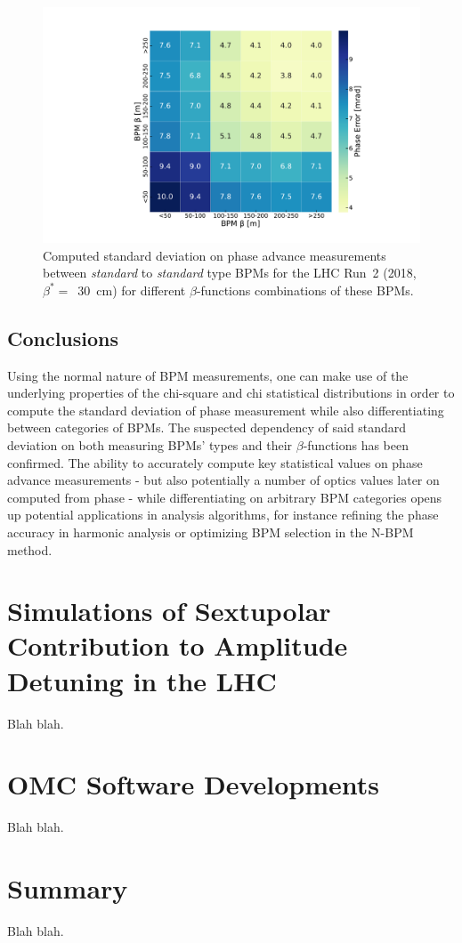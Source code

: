 \begin{figure}[!htb]
    \centering
    \includegraphics*[width=\textwidth]{Figures/Other_Studies/phase_stdev_heatmap_mrad_standard_standard.pdf}
    \caption{Computed standard deviation on phase advance measurements between \textit{standard} to \textit{standard} type BPMs for the LHC Run~\num{2} (\num{2018}, \(\beta^{\ast} =\)~\qty{30}{\centi\meter}) for different \(\beta\)-functions combinations of these BPMs.}
    \label{figure:phase_error_heatmap_standard_bpms}
\end{figure}

\subsection*{Conclusions}

Using the normal nature of BPM measurements, one can make use of the underlying properties of the chi-square and chi statistical distributions in order to compute the standard deviation of phase measurement while also differentiating between categories of BPMs.
The suspected dependency of said standard deviation on both measuring BPMs' types and their \(\beta\)-functions has been confirmed.
The ability to accurately compute key statistical values on phase advance measurements - but also potentially a number of optics values later on computed from phase - while differentiating on arbitrary BPM categories opens up potential applications in analysis algorithms, for instance refining the phase accuracy in  harmonic analysis or optimizing BPM selection in the N-BPM method.

\section{Simulations of Sextupolar Contribution to Amplitude Detuning in the LHC}

\cite{PRAB:White:Direct_Amplitude_Detuning_AC_Dipole}

Blah blah.

\section{OMC Software Developments}

Blah blah.

\section{Summary}

Blah blah.
